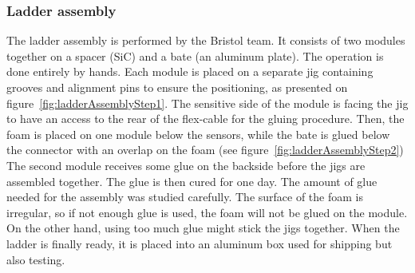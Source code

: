 

    \subsubsection{Ladder assembly}

    The ladder assembly is performed by the Bristol team.
    It consists of two modules together on a spacer (\gls{SiC}) and a bate (an aluminum plate).
    The operation is done entirely by hands.
    Each module is placed on a separate jig containing grooves and alignment pins to ensure the positioning, as presented on figure~\ref{fig:ladderAssemblyStep1}.
    The sensitive side of the module is facing the jig to have an access to the rear of the flex-cable for the gluing procedure.
    Then, the foam is placed on one module below the sensors, while the bate is glued below the connector with an overlap on the foam (see figure~\ref{fig:ladderAssemblyStep2})
    The second module receives some glue on the backside before the jigs are assembled together.
    The glue is then cured for one day.
    The amount of glue needed for the assembly was studied carefully. 
    The surface of the foam is irregular, so if not enough glue is used, the foam will not be glued on the module.
    On the other hand, using too much glue might stick the jigs together.
    When the ladder is finally ready, it is placed into an aluminum box used for shipping but also testing.
   
